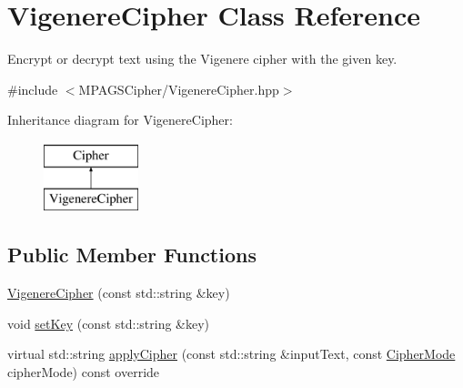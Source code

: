 \hypertarget{class_vigenere_cipher}{}\section{Vigenere\+Cipher Class Reference}
\label{class_vigenere_cipher}


Encrypt or decrypt text using the Vigenere cipher with the given key.  




{\ttfamily \#include $<$M\+P\+A\+G\+S\+Cipher/\+Vigenere\+Cipher.\+hpp$>$}

Inheritance diagram for Vigenere\+Cipher\+:\begin{figure}[H]
\begin{center}
\leavevmode
\includegraphics[height=2.000000cm]{class_vigenere_cipher}
\end{center}
\end{figure}
\subsection*{Public Member Functions}
\begin{DoxyCompactItemize}
\item 
\hyperlink{class_vigenere_cipher_ae4366bd9c507300040c276aff2b4088d}{Vigenere\+Cipher} (const std\+::string \&key)
\item 
void \hyperlink{class_vigenere_cipher_aed849482cc1402979c20d4087e6ca807}{set\+Key} (const std\+::string \&key)
\item 
virtual std\+::string \hyperlink{class_vigenere_cipher_ad302e0a368a7f61368f0cfa894bdb792}{apply\+Cipher} (const std\+::string \&input\+Text, const \hyperlink{_cipher_mode_8hpp_ac3adaabf9bad553901589ddf3de6daf5}{Cipher\+Mode} cipher\+Mode) const override
\end{DoxyCompactItemize}
